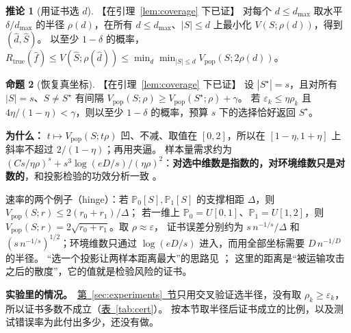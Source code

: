 \documentclass[11pt,a4paper,fontset=none]{ctexart}
\newcommand{\Secref}[1]{\hyperref[#1]{第~\ref*{#1}~节}}
\newcommand{\Tabref}[1]{\hyperref[#1]{表~\ref*{#1}}}
\newcommand{\Vp}{V_{\mathrm{pop}}}
\newcommand{\Rt}{R_{\mathrm{true}}}
\theoremstyle{definition}
\newtheorem{proposition}{命题}
\newtheorem{corollary}[proposition]{推论}
\newenvironment{why}{\par\noindent\textbf{为什么：}\ignorespaces}{\par}
\newcommand{\para}[1]{\par\smallskip\noindent\textbf{#1}\ }
\newcommand{\status}[1]{\textrm{【#1】}}
\begin{document}
\begin{corollary}[用证书选 $d$]\label{cor:budget}\status{在引理~\ref{lem:coverage} 下已证}
对每个 $d\le d_{\max}$ 取水平 $\delta/d_{\max}$ 的半径 $\rho(d)$，在所有 $d\le d_{\max}$、$|S|\le d$ 上最小化 $V(S;\rho(d))$，得到 $(\widehat d,\widehat S)$。
以至少 $1-\delta$ 的概率，$\Rt(\widehat f)\le V(\widehat S;\rho(\widehat d))\le\min_{d}\min_{|S|\le d}\Vp(S;2\rho(d))$。
\end{corollary}

\begin{proposition}[恢复真坐标]\label{prop:recovery}\status{在引理~\ref{lem:coverage} 下已证}
设 $|S^\star|=s$，且对所有 $|S|=s$、$S\ne S^\star$ 有间隔 $\Vp(S;\rho)\ge\Vp(S^\star;\rho)+\gamma$。
若 $\varepsilon_k\le\eta\rho_k$ 且 $4\eta/(1-\eta)<\gamma$，则以至少 $1-\delta$ 的概率，预算 $s$ 下的选择恰好返回 $S^\star$。
\end{proposition}
\begin{why}
$t\mapsto\Vp(S;t\rho)$ 凹、不减、取值在 $[0,2]$，所以在 $[1-\eta,1+\eta]$ 上斜率不超过 $2/(1-\eta)$；再用夹逼。
样本量需求约为 $(Cs/\eta\rho)^s+s^3\log(eD/s)/(\eta\rho)^2$：\textbf{对选中维数是指数的，对环境维数只是对数的}，和投影检验的功效分析一致 \cite{wang2021projected,wang2023variable}。
\end{why}
速率的两个例子（hinge）：若 $\mathbb P_0[S],\mathbb P_1[S]$ 的支撑相距 $\Delta$，则 $\Vp(S;r)\le2(r_0+r_1)/\Delta$；
若一维上 $\mathbb P_0=U[0,1]$、$\mathbb P_1=U[1,2]$，则 $\Vp(S;r)=2\sqrt{r_0+r_1}$。取 $\rho\approx\varepsilon$，
证书误差分别约为 $s\,n^{-1/s}/\Delta$ 和 $(s\,n^{-1/s})^{1/2}$；环境维数只通过 $\log(eD/s)$ 进入，而用全部坐标需要 $D\,n^{-1/D}$ 的半径。
“选一个投影让两样本距离最大”的思路见 \cite{mueller2015principal,wang2021projected,paty2019subspace,petrovich2022feature,wang2023variable}；
这里的距离是“被运输攻击之后的散度”，它的值就是检验风险的证书。

\para{实验里的情况。}\Secref{sec:experiments}只用交叉验证选半径，没有取 $\rho_k\ge\varepsilon_k$，所以证书多数不成立（\Tabref{tab:cert}）。
按本节取半径后证书成立的比例，以及测试错误率为此付出多少，还没有做。
\end{document}
